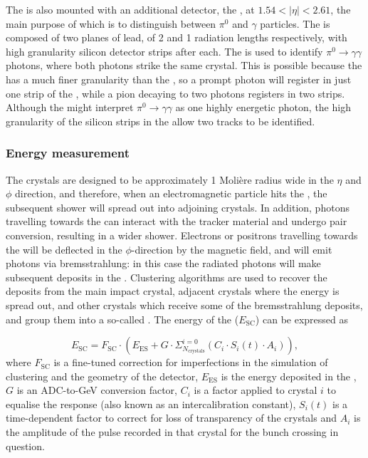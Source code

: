 The \ECAL is also mounted with an additional detector, the \ES, at $1.54 <|\eta| < 2.61$, the main purpose of which is to distinguish between $\pi^0$ and $\gamma$ particles. The \ES is composed of two planes of lead, of 2 and 1 radiation lengths respectively, with high granularity silicon detector strips after each. The \ES is used to identify $\pi^0\rightarrow \gamma \gamma$ photons, where both photons strike the same crystal. This is possible because the \ES has a much finer granularity than the \EE, so a prompt photon will register in just one strip of the \ES, while a pion decaying to two photons registers in two strips. Although the \EE might interpret $\pi^0\rightarrow \gamma \gamma$ as one highly energetic photon, the high granularity of the silicon strips in the \ES allow two tracks to be identified. 


\subsubsection{Energy measurement}
\label{sec:cms:ecal:energymeasurement}

The \CMS \ECAL crystals are designed to be approximately 1 Moli\`ere radius wide in the $\eta$ and $\phi$ direction, and therefore, when an electromagnetic particle hits the \ECAL, the subsequent shower will spread out into adjoining crystals. In addition, photons travelling towards the \ECAL can interact with the tracker material and undergo pair conversion, resulting in a wider shower. Electrons or positrons travelling towards the \ECAL will be deflected in the $\phi$-direction by the magnetic field, and will emit photons via bremsstrahlung: in this case the radiated photons will make subsequent deposits in the \ECAL. Clustering algorithms are used to recover the deposits from the main impact crystal, adjacent crystals where the energy is spread out, and other crystals which receive some of the bremsstrahlung deposits, and group them into a so-called \SC. %
The energy of the \SC ($E_{\textrm{SC}}$) can be expressed as 

\begin{equation} 
\label{eq:cms:ecal:energy}
E_{\text{SC}} = F_{\text{SC}} \cdot (E_{\text{ES}} + G  \cdot \Sigma^{i=0}_{N_\text{crystals}} ( C_{i} \cdot S_{i}(t) \cdot A_{i}) ),
\end{equation}
where $F_{\text{SC}}$ is a fine-tuned correction for imperfections in the simulation of clustering and the geometry of the detector, $E_{\textrm{ES}}$ is the energy deposited in the \ES, $G$ is an ADC-to-GeV conversion factor, $C_{i}$ is a factor applied to crystal $i$ to equalise the response (also known as an intercalibration constant), $S_{i}(t)$ is a time-dependent factor to correct for loss of transparency of the crystals and $A_{i}$ is the amplitude of the pulse recorded in that crystal for the bunch crossing in question.~\cite{cmsEcalCalibration}


